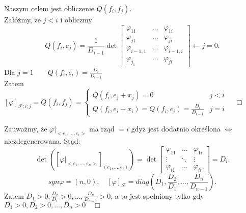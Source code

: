 \documentclass[../main.tex]{subfiles}
\begin{document}
    \begin{dowod}
        Naszym celem jest obliczenie $Q(f_i,f_j)$.\\
        Załóżmy, że $j<i$ i obliczmy
        \[
            Q(f_i,e_j) = \frac{1}{D_{i-1}}\det \begin{bmatrix} \varphi_{11}&\ldots&\varphi_{1i}\\
            \varphi_{j1}&\ldots&\varphi_{ji}\\
            \varphi_{i-1,1}&\ldots&\varphi_{i-1,i}\\
            \varphi_{j_1}&\ldots&\varphi_{ji}\end{bmatrix} \leftarrow j = 0
        .\]
        Dla $j=1 \quad\quad Q(f_i,e_i) = \frac{D_i}{D_{i-1}}$\\
        Zatem $\left[ \varphi \right] _{\mathcal{F};i;j} = Q(f_i,f_j) = \begin{cases}
            Q(f_i,e_j + x_j) = 0 &j<i\\
            Q(f_i,e_i + x_i) = Q(f_i,e_i) = \frac{D_i}{D_{i-1}} &j = i
        \end{cases}\quad\Box$
    \end{dowod}

    Zauważmy, że $\left. \varphi \right|_{<e_1,\ldots,e_i>} $ ma rząd $ = i$ gdyż jest dodatnio określona $\iff$ niezdegenerowana. Stąd:\\
        \[
            \det \left( \left[ \left. \varphi\right|_{<e_1,\ldots,e_n>} \right] _{(e_1,\ldots,e_i)} \right) = \det \begin{bmatrix} \varphi_{11}&\ldots&\varphi_{1i}\\ \vdots&\ddots&\vdots \\ \varphi_{i1}&\ldots&\varphi_{ii}\end{bmatrix} = D_i
        .\]
        \[
            sgn \varphi = (n,0),\quad \left[ \varphi \right] _\mathcal{F} = diag \left( D_1, \frac{D_2}{D_1},\ldots,\frac{D_{n}}{D_{n-1}} \right)
        .\]
        Zatem $D_1 > 0, \frac{D_2}{D_1}>0, \ldots, \frac{D_n}{D_{n-1}} > 0$, a to jest spełniony tylko gdy $D_1>0, D_2>0,\ldots,D_n>0\quad \Box$
\end{document}
